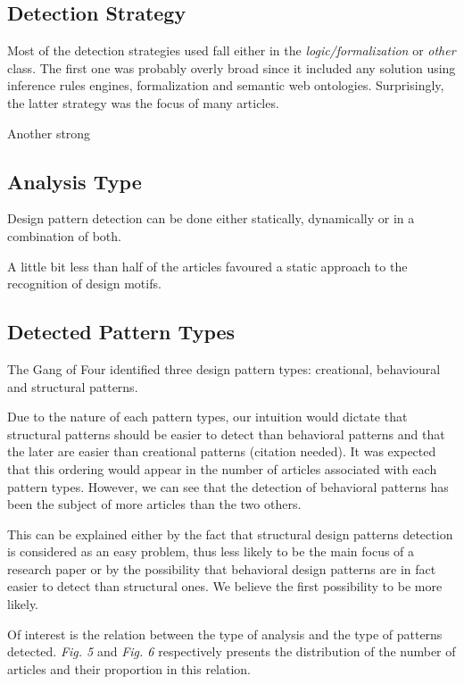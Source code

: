 \documentclass[letterpaper, 10 pt, conference]{ieeeconf}  %
\begin{document}

\subsection{Detection Strategy}

Most of the detection strategies used fall either in the 
\textit{logic/formalization} or \textit{other} class.
The first one was probably overly broad since it included any solution using
inference rules engines, formalization and semantic web ontologies.
Surprisingly, the latter strategy was the focus of many articles.

Another strong 


\subsection{Analysis Type}

Design pattern detection can be done either statically, dynamically or in
a combination of both.

A little bit less than half of the articles favoured a static approach to the
recognition of design motifs.





\subsection{Detected Pattern Types}

The Gang of Four identified three design pattern types: creational,
behavioural and structural patterns.

Due to the nature of each pattern types, our intuition would dictate that
structural patterns should be easier to detect than behavioral patterns and
that the later are easier than creational patterns (citation needed). 
It was expected that this ordering would appear in the number of articles
associated with each pattern types. 
However, we can see that the detection of behavioral patterns has been the
subject of more articles than the two others.


This can be explained either by the fact that structural design patterns
detection is considered as an easy problem, thus less likely to be the main
focus of a research paper or by the possibility that behavioral design
patterns are in fact easier to detect than structural ones.
We believe the first possibility to be more likely.

Of interest is the relation between the type of analysis and the type of
patterns detected. \textit{Fig. 5} and \textit{Fig. 6}
respectively presents the distribution of the number of articles and their
proportion in this relation. 
\end{document}
